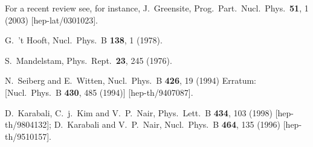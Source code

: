 \documentclass[prl,aps,
showpacs,
preprint,
nofootinbib,
floatfix,
superscriptaddress, showkeys
]{revtex4-1}
\begin{document}
\begin{thebibliography}{99}
 For a recent review see, for instance, J.~Greensite,
  Prog.\ Part.\ Nucl.\ Phys.\  {\bf 51}, 1 (2003)
  [hep-lat/0301023].



 

 
 
 
  G.~'t Hooft,
  Nucl.\ Phys.\ B {\bf 138}, 1 (1978).

  S.~Mandelstam,
  Phys.\ Rept.\  {\bf 23}, 245 (1976).
 
  N.~Seiberg and E.~Witten,
  Nucl.\ Phys.\ B {\bf 426}, 19 (1994)
  Erratum: [Nucl.\ Phys.\ B {\bf 430}, 485 (1994)]
  [hep-th/9407087].

  D.~Karabali, C.~j.~Kim and V.~P.~Nair,
  Phys.\ Lett.\ B {\bf 434}, 103 (1998)
  [hep-th/9804132];
  D.~Karabali and V.~P.~Nair,
  Nucl.\ Phys.\ B {\bf 464}, 135 (1996)
  [hep-th/9510157].
  

\end{thebibliography}
\end{document}
